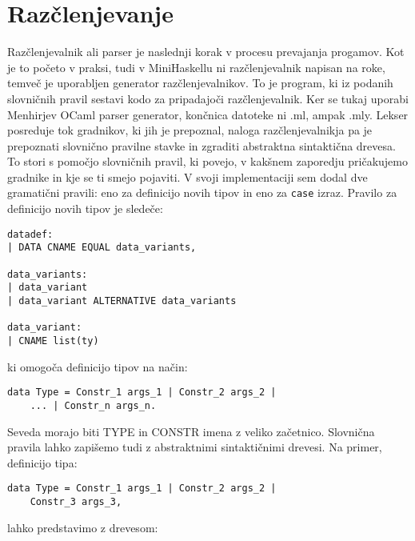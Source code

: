 \documentclass[12pt,a4paper,openany]{book}
\begin{document}
\section{Razčlenjevanje}
Razčlenjevalnik ali parser je naslednji korak v procesu prevajanja progamov. Kot je to početo v praksi, tudi v MiniHaskellu ni razčlenjevalnik napisan na roke, temveč 
je uporabljen generator razčlenjevalnikov. To je program, ki iz podanih slovničnih pravil sestavi kodo za pripadajoči razčlenjevalnik. Ker se tukaj uporabi Menhirjev OCaml parser generator, končnica 
datoteke ni .ml, ampak .mly. Lekser posreduje tok gradnikov, ki jih je prepoznal, naloga razčlenjevalnikja pa je prepoznati slovnično pravilne stavke in zgraditi 
abstraktna sintaktična drevesa. To stori s pomočjo slovničnih pravil, ki povejo, v kakšnem zaporedju pričakujemo gradnike in kje se ti smejo pojaviti. 
V svoji implementaciji sem dodal dve gramatični pravili: eno za definicijo novih tipov in eno za \lstinline{case} izraz. Pravilo za definicijo novih tipov je 
sledeče:
\begin{lstlisting}
datadef:
| DATA CNAME EQUAL data_variants,

data_variants:
| data_variant
| data_variant ALTERNATIVE data_variants

data_variant:
| CNAME list(ty)
\end{lstlisting}
ki omogoča definicijo tipov na način:
\begin{lstlisting}
data Type = Constr_1 args_1 | Constr_2 args_2 | 
    ... | Constr_n args_n.
\end{lstlisting}
Seveda morajo biti TYPE in CONSTR imena z veliko začetnico. Slovnična pravila lahko zapišemo tudi z abstraktnimi sintaktičnimi drevesi. Na primer, 
definicijo tipa:
\begin{lstlisting}
data Type = Constr_1 args_1 | Constr_2 args_2 | 
    Constr_3 args_3,
\end{lstlisting}
lahko predstavimo z drevesom:
\begin{center}
\end{center}
\end{document}
